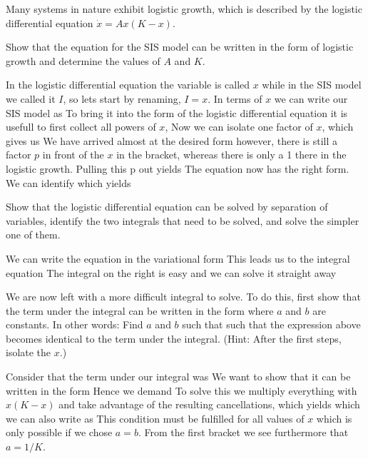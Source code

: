 \label{exGrowSIS}
Many systems in nature exhibit logistic growth, which is described by the logistic differential equation  $\dot{x}=Ax(K-x)$.

\subquestion Show that the equation for the SIS model can be written in the form of logistic growth and determine the values of $A$ and $K$.

\solution 
In the logistic differential equation the variable is called $x$ while in the SIS model we called it $I$, so lets start by renaming, $I=x$. In terms of $x$ we can write our SIS model as 
To bring it into the form of the logistic differential equation it is usefull to first collect all powers of $x$,
Now we can isolate one factor of $x$, which gives us
We have arrived almost at the desired form however, there is still a factor $p$ in front of the $x$ in the bracket, whereas there is only a 1 there in the logistic growth. Pulling this p out yields
The equation now has the right form. We can identify 
which yields

\subquestion
Show that the logistic differential equation can be solved by separation of variables, identify the two integrals that need to be solved, and solve the simpler one of them.  

\solution 
We can write the equation in the variational form 
This leads us to the integral equation 
The integral on the right is easy and we can solve it straight away

\subquestion
We are now left with a more difficult integral to solve. To do this, first show that the term under the integral can be written in the form
where $a$ and $b$ are constants. In other words: Find $a$ and $b$ such that such that the expression above becomes identical to the term under the integral. (Hint: After the first steps, isolate the $x$.)

\solution 
Consider that the term under our integral was 
We want to show that it can be written in the form 
Hence we demand 
To solve this we multiply everything with $x(K-x)$ and take advantage of the resulting cancellations, which yields 
which we can also write as 
This condition must be fulfilled for all values of $x$ which is only possible if we chose $a=b$. From the first bracket we see furthermore that $a=1/K$.

